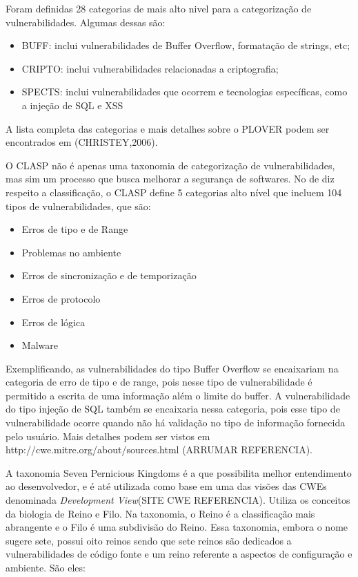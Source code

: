 %

Foram definidas 28 categorias de mais alto nivel para a categorização de vulnerabilidades. Algumas dessas são:

\begin{itemize}
\item BUFF: inclui vulnerabilidades de Buffer Overflow, formatação de strings, etc;
\item CRIPTO: inclui vulnerabilidades relacionadas a criptografia;
\item SPECTS: inclui vulnerabilidades que ocorrem e tecnologias específicas, como a injeção de SQL e XSS
\end{itemize}

A lista completa das categorias e mais detalhes sobre o PLOVER podem ser encontrados em (CHRISTEY,2006).

%

O CLASP não é apenas uma taxonomia de categorização de vulnerabilidades, mas sim um processo que busca melhorar a segurança de softwares. No de diz respeito a classificação, o CLASP define 5 categorias alto nível que incluem 104 tipos de vulnerabilidades, que são:

\begin{itemize}
\item Erros de tipo e de Range
\item Problemas no ambiente 
\item Erros de sincronização e de temporização
\item Erros de protocolo
\item Erros de lógica
\item Malware
\end{itemize}

%
Exemplificando, as vulnerabilidades do tipo Buffer Overflow se encaixariam na categoria de erro de tipo e de range, pois nesse tipo de vulnerabilidade é permitido a escrita de uma informação além o limite do buffer. A vulnerabilidade do tipo  injeção de SQL também se encaixaria nessa categoria, pois esse tipo de vulnerabilidade ocorre quando não há validação no tipo de informação fornecida pelo usuário. Mais detalhes podem ser vistos em http://cwe.mitre.org/about/sources.html (ARRUMAR REFERENCIA).

%

A taxonomia Seven Pernicious Kingdoms é a que possibilita melhor entendimento ao desenvolvedor, e é até utilizada como base em uma das visões das CWEs denominada \emph{Development View}(SITE CWE REFERENCIA). Utiliza os conceitos da biologia de Reino e Filo. Na taxonomia, o Reino é a classificação mais abrangente e o Filo é uma subdivisão do Reino. Essa taxonomia, embora o nome sugere sete, possui oito reinos sendo que sete reinos são dedicados a vulnerabilidades de código fonte e um reino referente a aspectos de configuração e ambiente. São eles:

